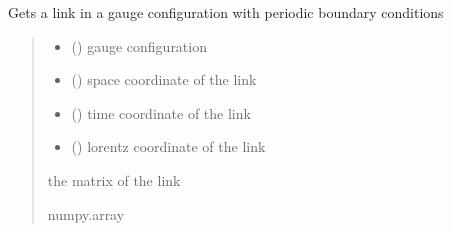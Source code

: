 \documentclass[letterpaper,10pt,english]{sphinxmanual}
\begin{document}

\begin{fulllineitems}
\label{\detokenize{gauge_su3:gauge_su3.get_link}}
\pysigstartsignatures
\pysiglinewithargsret
{}
{\sphinxparamcomma {}\sphinxparamcomma {}\sphinxparamcomma {}}
{}
\pysigstopsignatures
\sphinxAtStartPar
Gets a link in a gauge configuration with periodic boundary conditions
\begin{quote}\begin{description}
\begin{itemize}
\item {} 
\sphinxAtStartPar
{} () \textendash{} gauge configuration

\item {} 
\sphinxAtStartPar
{} () \textendash{} space coordinate of the link

\item {} 
\sphinxAtStartPar
{} () \textendash{} time coordinate of the link

\item {} 
\sphinxAtStartPar
{} () \textendash{} lorentz coordinate of the link

\end{itemize}

\sphinxAtStartPar
the matrix of the link

\sphinxAtStartPar
numpy.array

\end{description}\end{quote}

\end{fulllineitems}

\end{document}
